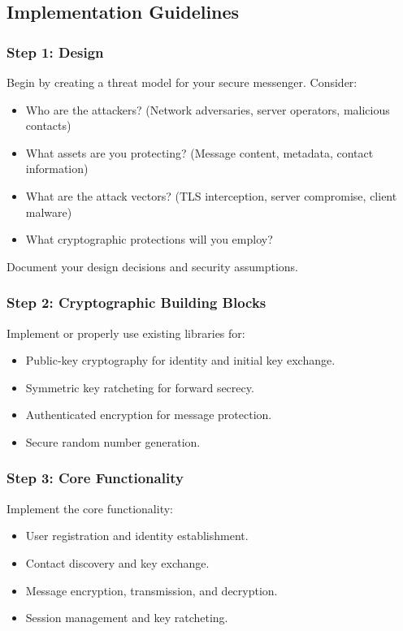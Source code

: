 \documentclass[10pt,a4paper,american]{article}
\begin{document}
\subsection*{Implementation Guidelines}

\subsubsection*{Step 1: Design}
Begin by creating a threat model for your secure messenger. Consider:
\begin{itemize}
	\item Who are the attackers? (Network adversaries, server operators, malicious contacts)
	\item What assets are you protecting? (Message content, metadata, contact information)
	\item What are the attack vectors? (TLS interception, server compromise, client malware)
	\item What cryptographic protections will you employ?
\end{itemize}

Document your design decisions and security assumptions.

\subsubsection*{Step 2: Cryptographic Building Blocks}
Implement or properly use existing libraries for:
\begin{itemize}
	\item Public-key cryptography for identity and initial key exchange.
	\item Symmetric key ratcheting for forward secrecy.
	\item Authenticated encryption for message protection.
	\item Secure random number generation.
\end{itemize}

\subsubsection*{Step 3: Core Functionality}
Implement the core functionality:
\begin{itemize}
	\item User registration and identity establishment.
	\item Contact discovery and key exchange.
	\item Message encryption, transmission, and decryption.
	\item Session management and key ratcheting.
\end{itemize}
\end{document}
